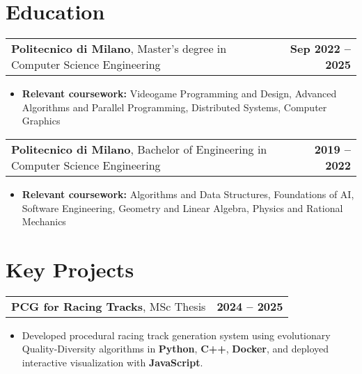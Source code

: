 \documentclass[10pt, letterpaper]{article}
\newenvironment{highlights}{
    \begin{itemize}[topsep=0cm, parsep=0.05cm, itemsep=0.05cm, leftmargin=1.0cm]
}{
    \end{itemize}
}
\begin{document}
\section{Education}

\begin{tabularx}{\textwidth}{@{}Xr@{}}
    \textbf{Politecnico di Milano}, Master's degree in Computer Science Engineering & \textbf{Sep 2022 – 2025}
\end{tabularx}

\begin{highlights}
    \item \textbf{Relevant coursework:} Videogame Programming and Design, Advanced Algorithms and Parallel Programming, Distributed Systems, Computer Graphics
\end{highlights}

\vspace{0.2cm}

\begin{tabularx}{\textwidth}{@{}Xr@{}}
    \textbf{Politecnico di Milano}, Bachelor of Engineering in Computer Science Engineering & \textbf{2019 – 2022}
\end{tabularx}

\begin{highlights}
    \item \textbf{Relevant coursework:} Algorithms and Data Structures, Foundations of AI, Software Engineering, Geometry and Linear Algebra, Physics and Rational Mechanics
\end{highlights}

\vspace{0.2cm}

\section{Key Projects}

\begin{tabularx}{\textwidth}{@{}Xr@{}}
    \textbf{PCG for Racing Tracks}, MSc Thesis & \textbf{2024 – 2025}
\end{tabularx}

\begin{highlights}
    \item Developed procedural racing track generation system using evolutionary Quality-Diversity algorithms in \textbf{Python}, \textbf{C++}, \textbf{Docker}, and deployed interactive visualization with \textbf{JavaScript}.
\end{highlights}
\end{document}
